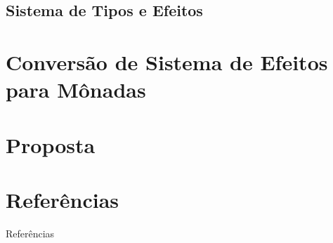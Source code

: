 \documentclass[xcolor=table]{beamer}
\begin{document}
    \subsection{Sistema de Tipos e Efeitos}
    

    \section[]{Conversão de Sistema de Efeitos para Mônadas}
    

    \section[]{Proposta}
    
    

    \section[]{Referências}
    \begin{frame}[allowframebreaks]{Referências}
        
    \end{frame}
\end{document}

